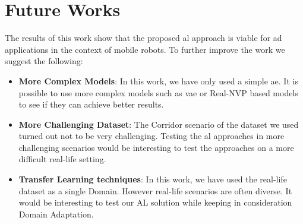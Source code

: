 \section{Future Works}
The results of this work show that the proposed \acrshort{al} approach is viable for \acrshort{ad} applications in the context of mobile robots. To further improve the work we suggest the following:

\begin{itemize}
    \item \textbf{More Complex Models}:
    In this work, we have only used a simple \acrfull{ae}. It is possible to use more complex models such as \acrfull{vae} or Real-NVP based models to see if they can achieve better results.
    \item \textbf{More Challenging Dataset}:
    The Corridor scenario of the dataset we used turned out not to be very challenging. Testing the \acrshort{al} approaches in more challenging scenarios would be interesting to test the approaches on a more difficult real-life setting.
    \item \textbf{Transfer Learning techniques}:
    In this work, we have used the real-life dataset as a single Domain. However real-life scenarios are often diverse. It would be interesting to test our AL solution while keeping in consideration Domain Adaptation.
\end{itemize}